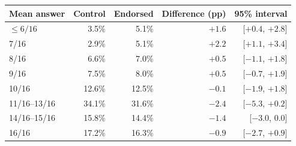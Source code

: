 \begin{tabular}{lrrrr}
\toprule
Mean answer & Control & Endorsed & Difference (pp) & 95\% interval \\
\midrule
$\leq 6/16$ & 3.5\% & 5.1\% & $+1.6$ & [$+0.4$, $+2.8$] \\
7/16 & 2.9\% & 5.1\% & $+2.2$ & [$+1.1$, $+3.4$] \\
8/16 & 6.6\% & 7.0\% & $+0.5$ & [$-1.1$, $+1.8$] \\
9/16 & 7.5\% & 8.0\% & $+0.5$ & [$-0.7$, $+1.9$] \\
10/16 & 12.6\% & 12.5\% & $-0.1$ & [$-1.9$, $+1.8$] \\
11/16--13/16 & 34.1\% & 31.6\% & $-2.4$ & [$-5.3$, $+0.2$] \\
14/16--15/16 & 15.8\% & 14.4\% & $-1.4$ & [$-3.0$, $0.0$] \\
16/16 & 17.2\% & 16.3\% & $-0.9$ & [$-2.7$, $+0.9$] \\
\bottomrule
\end{tabular}
